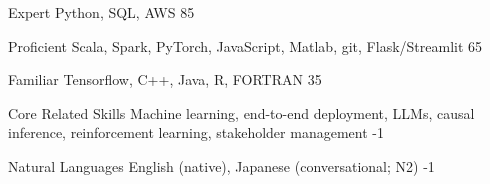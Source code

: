 



\begin{cvskills}

  \cvskill
    {Expert} %
    {Python, SQL, AWS}
    {85}

  \cvskill
    {Proficient} %
    {Scala, Spark, PyTorch, JavaScript, Matlab, git, Flask/Streamlit}
    {65}


  \cvskill
    {Familiar} %
    {Tensorflow, C++, Java, R, FORTRAN}
    {35}

\end{cvskills}




\begin{cvskills}

  \cvskill
    {Core Related Skills} %
    {Machine learning, end-to-end deployment, LLMs, causal inference, reinforcement learning, stakeholder management}
    {-1}

  \cvskill
    {Natural Languages} %
    {English (native), Japanese (conversational; N2)} %
    {-1}

\end{cvskills}